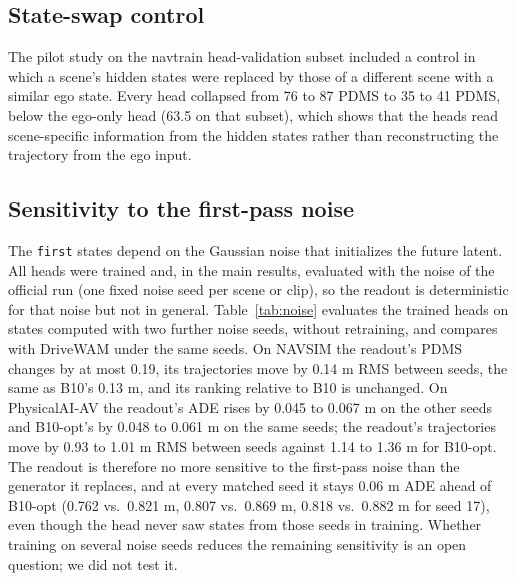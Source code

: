 \documentclass[10pt]{article}
\newcommand{\first}{\texttt{first}}
\begin{document}
\subsection{State-swap control}
\label{sec:swap}

The pilot study on the navtrain head-validation subset included a control in which a scene's hidden states were replaced by those of a different scene with a similar ego state. Every head collapsed from 76 to 87 PDMS to 35 to 41 PDMS, below the ego-only head (63.5 on that subset), which shows that the heads read scene-specific information from the hidden states rather than reconstructing the trajectory from the ego input.

\subsection{Sensitivity to the first-pass noise}
\label{sec:noise}

The \first{} states depend on the Gaussian noise that initializes the future latent. All heads were trained and, in the main results, evaluated with the noise of the official run (one fixed noise seed per scene or clip), so the readout is deterministic for that noise but not in general. Table~\ref{tab:noise} evaluates the trained heads on states computed with two further noise seeds, without retraining, and compares with DriveWAM under the same seeds. On NAVSIM the readout's PDMS changes by at most 0.19, its trajectories move by 0.14 m RMS between seeds, the same as B10's 0.13 m, and its ranking relative to B10 is unchanged. On PhysicalAI-AV the readout's ADE rises by 0.045 to 0.067 m on the other seeds and B10-opt's by 0.048 to 0.061 m on the same seeds; the readout's trajectories move by 0.93 to 1.01 m RMS between seeds against 1.14 to 1.36 m for B10-opt. The readout is therefore no more sensitive to the first-pass noise than the generator it replaces, and at every matched seed it stays 0.06 m ADE ahead of B10-opt (0.762 vs.\ 0.821 m, 0.807 vs.\ 0.869 m, 0.818 vs.\ 0.882 m for seed 17), even though the head never saw states from those seeds in training. Whether training on several noise seeds reduces the remaining sensitivity is an open question; we did not test it.
\end{document}
